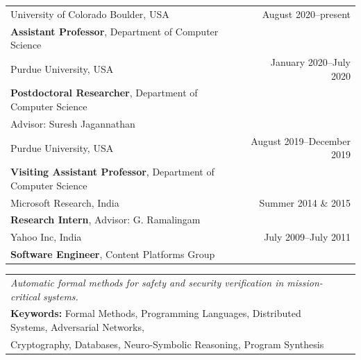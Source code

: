 \documentclass{article}
\begin{document}
\begin{center}
  \begin{tabular}{ p{10cm}  r}
    University of Colorado Boulder, USA  & August 2020--present \\
    {\bf Assistant Professor}, Department of Computer Science &\\[12pt]

    Purdue University, USA & January 2020--July 2020 \\
    {\bf Postdoctoral Researcher}, Department of Computer Science &\\
    Advisor: Suresh Jagannathan &\\[12pt]

    Purdue University, USA & August 2019--December 2019 \\
    {\bf Visiting Assistant Professor}, Department of Computer Science &\\[12pt]

    Microsoft Research, India & Summer 2014 \& 2015 \\
    {\bf Research Intern}, Advisor: G. Ramalingam &\\[12pt]

    Yahoo Inc, India & July 2009--July 2011 \\
    {\bf Software Engineer}, Content Platforms Group &\\[12pt]
    \end{tabular}
\end{center}


\begin{center}
  \begin{tabular}{ l  r }
    \emph{Automatic formal methods for safety and security verification in mission-critical systems.} & \\ [5pt]
{\bf Keywords:} Formal Methods, Programming Languages, Distributed Systems,
Adversarial Networks, &\\
Cryptography, Databases, Neuro-Symbolic Reasoning, Program Synthesis&\\ 
\end{tabular}
\end{center}


\vspace{1em}
\end{document}
